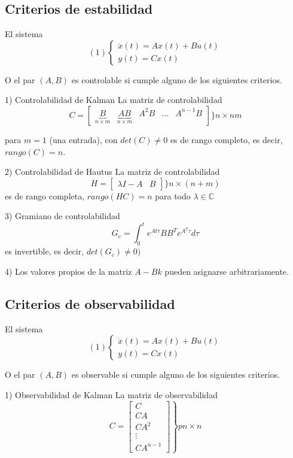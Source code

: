 \subsection{Criterios de estabilidad}

El sistema 
\[
    (1)
    \left\{
        \begin{array}{lll}
            \dot{x}(t) = Ax(t) + Bu(t)\\
            y(t) = Cx(t)
        \end{array}
    \right.
\]

O el par \( (A, B)\) es controlable si cumple alguno de los siguientes criterios.

1) Controlabilidad de Kalman
La matriz de controlabilidad
\[
    C = 
    \begin{bmatrix}
        \underbrace{B}_{n\times m} &
        \underbrace{AB}_{n\times m} &
        A^{2}B & \ldots & A^{n-1}B
    \end{bmatrix}
    \Big\} n\times nm
\]

para \( m=1 \) (una entrada), con \( det(C)\not= 0 \) es de rango completo, es decir, \( rango(C)=n \).

2) Controlabilidad de Hautus
La matriz de controlabilidad
\[
    H =
    \begin{bmatrix}
        \lambda I-A & B
    \end{bmatrix}
    \Big \} n\times(n+m)
\]
es de rango completa, \( rango(HC)=n \) para todo \( \lambda \in \mathbb{C} \)

3) Gramiano de controlabilidad
\[
    G_{c} = \int_{0}^{t} e^{At\tau}BB^{T}e^{A^{T}\tau}d\tau
\]
es invertible, es decir, \( det(G_{c}) \not= 0) \)

4) Los valores propios de la matriz \( A-Bk \) pueden asignarse arbitrariamente.

\subsection{Criterios de observabilidad}
El sistema 
\[
    (1)
    \left\{
        \begin{array}{lll}
            \dot{x}(t) = Ax(t) + Bu(t)\\
            y(t) = Cx(t)
        \end{array}
    \right.
\]

O el par \( (A, B)\) es observable si cumple alguno de los siguientes criterios.

1) Observabilidad de Kalman
La matriz de observabilidad
\[
    C = 
    \left.
    \begin{bmatrix}
        C \\
        CA \\
        CA^{2} \\ \vdots \\
        CA^{n-1}
    \end{bmatrix}
    \right\} pn\times n
\]


